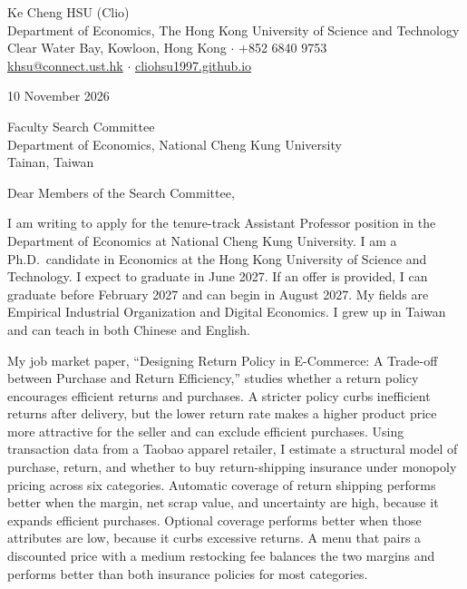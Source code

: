 \documentclass[11pt]{article}
\begin{document}
\begin{flushleft}
Ke Cheng HSU (Clio) \\
Department of Economics, The Hong Kong University of Science and Technology \\
Clear Water Bay, Kowloon, Hong Kong $\cdot$ +852 6840 9753 \\
\href{mailto:khsu@connect.ust.hk}{khsu@connect.ust.hk} $\cdot$ \href{https://cliohsu1997.github.io/}{cliohsu1997.github.io}
\end{flushleft}

10 November 2026

\vspace{0.12em}
Faculty Search Committee \\
Department of Economics, National Cheng Kung University \\
Tainan, Taiwan

\vspace{0.12em}
Dear Members of the Search Committee,

I am writing to apply for the tenure-track Assistant Professor position in the Department of Economics at National Cheng Kung University. I am a Ph.D.\ candidate in Economics at the Hong Kong University of Science and Technology. I expect to graduate in June 2027. If an offer is provided, I can graduate before February 2027 and can begin in August 2027. My fields are Empirical Industrial Organization and Digital Economics. I grew up in Taiwan and can teach in both Chinese and English.

My job market paper, ``Designing Return Policy in E-Commerce: A Trade-off between Purchase and Return Efficiency,'' studies whether a return policy encourages efficient returns and purchases. A stricter policy curbs inefficient returns after delivery, but the lower return rate makes a higher product price more attractive for the seller and can exclude efficient purchases. Using transaction data from a Taobao apparel retailer, I estimate a structural model of purchase, return, and whether to buy return-shipping insurance under monopoly pricing across six categories. Automatic coverage of return shipping performs better when the margin, net scrap value, and uncertainty are high, because it expands efficient purchases. Optional coverage performs better when those attributes are low, because it curbs excessive returns. A menu that pairs a discounted price with a medium restocking fee balances the two margins and performs better than both insurance policies for most categories.
\end{document}
